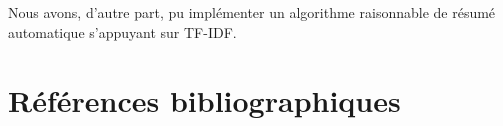 \documentclass[a4paper, 12pt]{article}
\begin{document}
Nous avons, d'autre part, pu implémenter un algorithme raisonnable de résumé automatique s'appuyant sur TF-IDF. %



\vspace{1\baselineskip}












\section{Références bibliographiques}
\end{document}
